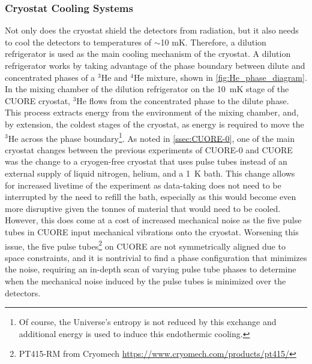 \subsubsection*{Cryostat Cooling Systems}
\label{sssec:Cooling Systems}
Not only does the cryostat shield the detectors from radiation, but it also needs to cool the detectors to temperatures of $\sim$10 mK.
Therefore, a dilution refrigerator is used as the main cooling mechanism of the cryostat.
A dilution refrigerator works by taking advantage of the phase boundary between dilute and concentrated phases of a $^3$He and $^4$He mixture, shown in \autoref{fig:He_phase_diagram}.
In the mixing chamber of the dilution refrigerator on the 10~mK stage of the CUORE cryostat, $^3$He flows from the concentrated phase to the dilute phase.
This process extracts energy from the environment of the mixing chamber, and, by extension, the coldest stages of the cryostat, as energy is required to move the $^3$He across the phase boundary\footnote{Of course, the Universe's entropy is not reduced by this exchange and additional energy is used to induce this endothermic cooling.}.
As noted in \autoref{ssec:CUORE-0}, one of the main cryostat changes between the previous experiments of CUORE-0 and CUORE was the change to a cryogen-free cryostat that uses pulse tubes instead of an external supply of liquid nitrogen, helium, and a 1~K bath.
This change allows for increased livetime of the experiment as data-taking does not need to be interrupted by the need to refill the bath, especially as this would become even more disruptive given the tonnes of material that would need to be cooled.
However, this does come at a cost of increased mechanical noise as the five pulse tubes in CUORE input mechanical vibrations onto the cryostat.
Worsening this issue, the five pulse tubes\footnote{PT415-RM from Cryomech \url{https://www.cryomech.com/products/pt415/}} on CUORE are not symmetrically aligned due to space constraints, and it is nontrivial to find a phase configuration that minimizes the noise, requiring an in-depth scan of varying pulse tube phases to determine when the mechanical noise induced by the pulse tubes is minimized over the detectors.


